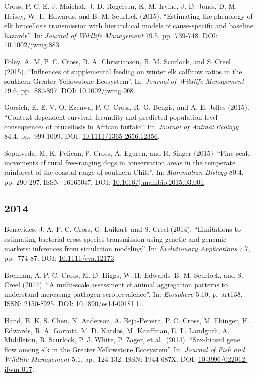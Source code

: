 \documentclass[12pt,]{article}
\begin{document}
Cross, P. C, E. J. Maichak, J. D. Rogerson, K. M. Irvine, J. D. Jones,
D. M. Heisey, W. H. Edwards, and B. M. Scurlock (2015). ``Estimating the
phenology of elk brucellosis transmission with hierarchical models of
cause-specific and baseline hazards''. In: \emph{Journal of Wildlife
Management} 79.5, pp.~739-748. DOI:
\href{https://doi.org/10.1002\%2Fjwmg.883}{10.1002/jwmg.883}.

Foley, A. M, P. C. Cross, D. A. Christianson, B. M. Scurlock, and S.
Creel (2015). ``Influences of supplemental feeding on winter elk
calf:cow ratios in the southern Greater Yellowstone Ecosystem''. In:
\emph{Journal of Wildlife Management} 79.6, pp.~887-897. DOI:
\href{https://doi.org/10.1002\%2Fjwmg.908}{10.1002/jwmg.908}.

Gorsich, E. E, V. O. Ezenwa, P. C. Cross, R. G. Bengis, and A. E. Jolles
(2015). ``Context-dependent survival, fecundity and predicted
population-level consequences of brucellosis in African buffalo''. In:
\emph{Journal of Animal Ecology} 84.4, pp.~999-1009. DOI:
\href{https://doi.org/10.1111\%2F1365-2656.12356}{10.1111/1365-2656.12356}.

Sepulveda, M, K. Pelican, P. Cross, A. Eguren, and R. Singer (2015).
``Fine-scale movements of rural free-ranging dogs in conservation areas
in the temperate rainforest of the coastal range of southern Chile''.
In: \emph{Mammalian Biology} 80.4, pp. 290-297. ISSN: 16165047. DOI:
\href{https://doi.org/10.1016\%2Fj.mambio.2015.03.001}{10.1016/j.mambio.2015.03.001}.

\hypertarget{section-5}{%
\subsection{2014}\label{section-5}}

Benavides, J. A, P. C. Cross, G. Luikart, and S. Creel (2014).
``Limitations to estimating bacterial cross-species transmission using
genetic and genomic markers: inferences from simulation modeling''. In:
\emph{Evolutionary Applications} 7.7, pp.~774-87. DOI:
\href{https://doi.org/10.1111\%2Feva.12173}{10.1111/eva.12173}.

Brennan, A, P. C. Cross, M. D. Higgs, W. H. Edwards, B. M. Scurlock, and
S. Creel (2014). ``A multi-scale assessment of animal aggregation
patterns to understand increasing pathogen seroprevalence''. In:
\emph{Ecosphere} 5.10, p.~art138. ISSN: 2150-8925. DOI:
\href{https://doi.org/10.1890\%2Fes14-00181.1}{10.1890/es14-00181.1}.

Hand, B. K, S. Chen, N. Anderson, A. Beja-Pereira, P. C. Cross, M.
Ebinger, H. Edwards, R. A. Garrott, M. D. Kardos, M. Kauffman, E. L.
Landguth, A. Middleton, B. Scurlock, P. J. White, P. Zager, et
al.~(2014). ``Sex-biased gene flow among elk in the Greater Yellowstone
Ecosystem''. In: \emph{Journal of Fish and Wildlife Management} 5.1,
pp.~124-132. ISSN: 1944-687X. DOI:
\href{https://doi.org/10.3996\%2F022012-jfwm-017}{10.3996/022012-jfwm-017}.
\end{document}
